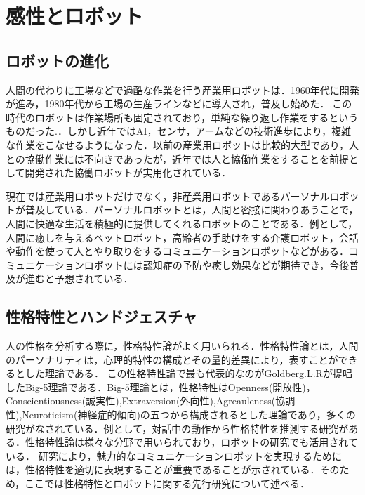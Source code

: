 \newpage

\section{感性とロボット}
\label{sec2.3}

\subsection{ロボットの進化}
\label{sec2.3.1}
人間の代わりに工場などで過酷な作業を行う産業用ロボットは．1960年代に開発が進み，1980年代から工場の生産ラインなどに導入され，普及し始めた．.この時代のロボットは作業場所も固定されており，単純な繰り返し作業をするというものだった.．しかし近年ではAI，センサ，アームなどの技術進歩により，複雑な作業をこなせるようになった．以前の産業用ロボットは比較的大型であり，人との協働作業には不向きであったが，近年では人と協働作業をすることを前提として開発された協働ロボットが実用化されている．

現在では産業用ロボットだけでなく，非産業用ロボットであるパーソナルロボットが普及している．パーソナルロボットとは，人間と密接に関わりあうことで，人間に快適な生活を積極的に提供してくれるロボットのことである．例として，人間に癒しを与えるペットロボット，高齢者の手助けをする介護ロボット，会話や動作を使って人とやり取りをするコミュニケーションロボットなどがある．コミュニケーションロボットには認知症の予防や癒し効果などが期待でき，今後普及が進むと予想されている．


\subsection{性格特性とハンドジェスチャ}
\label{sec2.3.2}

人の性格を分析する際に，性格特性論がよく用いられる．性格特性論とは，人間のパーソナリティは，心理的特性の構成とその量的差異により，表すことができるとした理論である\cite{性格特性論}．
この性格特性論で最も代表的なのがGoldberg.L.Rが提唱したBig-5理論である．Big-5理論とは，性格特性はOpenness(開放性)，Conscientiousness(誠実性),Extraversion(外向性),Agreauleness(協調性),Neuroticism(神経症的傾向)の五つから構成されるとした理論であり，多くの研究がなされている．例として，対話中の動作から性格特性を推測する研究がある\cite{性格特性推測}．性格特性論は様々な分野で用いられており，ロボットの研究でも活用されている．
研究により，魅力的なコミュニケーションロボットを実現するためには，性格特性を適切に表現することが重要であることが示されている\cite{ロボットの性格特性1}\cite{ロボットの性格特性2}\cite{ロボットの性格特性3}．そのため，ここでは性格特性とロボットに関する先行研究について述べる．

